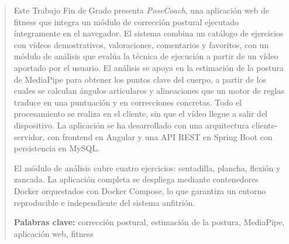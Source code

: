 \documentclass[12pt,a4paper,twoside,openright]{book}
\begin{document}
    \renewcommand{\abstractname}{Resumen}
    \begin{abstract}
        Este Trabajo Fin de Grado presenta \emph{PoseCoach}, una aplicación web
        de fitness que integra un módulo de corrección postural ejecutado
        íntegramente en el navegador. El sistema combina un catálogo de
        ejercicios con vídeos demostrativos, valoraciones, comentarios y
        favoritos, con un módulo de análisis que evalúa la técnica de ejecución
        a partir de un vídeo aportado por el usuario. El análisis se apoya en la
        estimación de la postura de MediaPipe para obtener los puntos clave del cuerpo,
        a partir de los cuales se calculan ángulos articulares y alineaciones que
        un motor de reglas traduce en una puntuación y en correcciones concretas.
        Todo el procesamiento se realiza en el cliente, sin que el vídeo llegue a
        salir del dispositivo. La aplicación se ha desarrollado con una
        arquitectura cliente-servidor, con frontend en Angular y una API REST en
        Spring Boot con persistencia en MySQL.
        
        El módulo de análisis cubre cuatro ejercicios: sentadilla, plancha,
        flexión y zancada. La aplicación completa se despliega mediante
        contenedores Docker orquestados con Docker Compose, lo que garantiza un
        entorno reproducible e independiente del sistema anfitrión.
        \medskip

        \noindent\textbf{Palabras clave:} corrección postural, estimación de
        la postura, MediaPipe, aplicación web, fitness
    \end{abstract}
\end{document}
